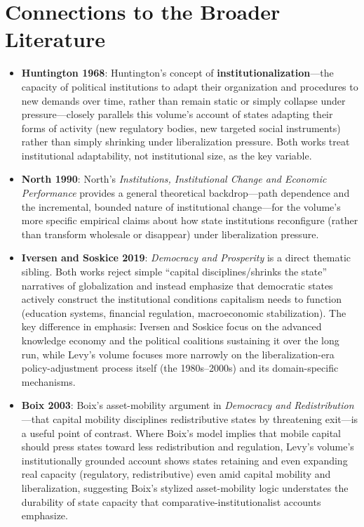 \documentclass[12pt]{article}
\begin{document}
\section{Connections to the Broader Literature}

\begin{itemize}[leftmargin=*, itemsep=4pt]
    \item \textbf{Huntington 1968}: Huntington's concept of \textbf{institutionalization}---the capacity of political institutions to adapt their organization and procedures to new demands over time, rather than remain static or simply collapse under pressure---closely parallels this volume's account of states adapting their forms of activity (new regulatory bodies, new targeted social instruments) rather than simply shrinking under liberalization pressure. Both works treat institutional adaptability, not institutional size, as the key variable.
    \item \textbf{North 1990}: North's \textit{Institutions, Institutional Change and Economic Performance} provides a general theoretical backdrop---path dependence and the incremental, bounded nature of institutional change---for the volume's more specific empirical claims about how state institutions reconfigure (rather than transform wholesale or disappear) under liberalization pressure.
    \item \textbf{Iversen and Soskice 2019}: \textit{Democracy and Prosperity} is a direct thematic sibling. Both works reject simple ``capital disciplines/shrinks the state'' narratives of globalization and instead emphasize that democratic states actively construct the institutional conditions capitalism needs to function (education systems, financial regulation, macroeconomic stabilization). The key difference in emphasis: Iversen and Soskice focus on the advanced knowledge economy and the political coalitions sustaining it over the long run, while Levy's volume focuses more narrowly on the liberalization-era policy-adjustment process itself (the 1980s--2000s) and its domain-specific mechanisms.
    \item \textbf{Boix 2003}: Boix's asset-mobility argument in \textit{Democracy and Redistribution}---that capital mobility disciplines redistributive states by threatening exit---is a useful point of contrast. Where Boix's model implies that mobile capital should press states toward less redistribution and regulation, Levy's volume's institutionally grounded account shows states retaining and even expanding real capacity (regulatory, redistributive) even amid capital mobility and liberalization, suggesting Boix's stylized asset-mobility logic understates the durability of state capacity that comparative-institutionalist accounts emphasize.

\end{itemize}
\end{document}
